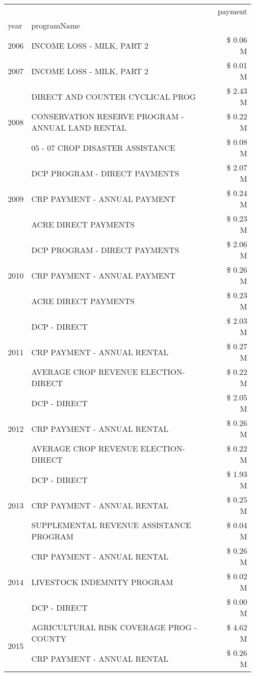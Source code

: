 \begin{tabular}{llr}
\toprule
 &  & payment \\
year & programName &  \\
\midrule
2006 & INCOME LOSS - MILK, PART 2 & \$ 0.06 M \\
\cline{1-3}
2007 & INCOME LOSS - MILK, PART 2 & \$ 0.01 M \\
\cline{1-3}
\multirow[t]{3}{*}{2008} & DIRECT AND COUNTER CYCLICAL PROG & \$ 2.43 M \\
 & CONSERVATION RESERVE PROGRAM - ANNUAL LAND RENTAL & \$ 0.22 M \\
 & 05 - 07 CROP DISASTER ASSISTANCE & \$ 0.08 M \\
\cline{1-3}
\multirow[t]{3}{*}{2009} & DCP PROGRAM - DIRECT PAYMENTS & \$ 2.07 M \\
 & CRP PAYMENT - ANNUAL PAYMENT & \$ 0.24 M \\
 & ACRE DIRECT PAYMENTS & \$ 0.23 M \\
\cline{1-3}
\multirow[t]{3}{*}{2010} & DCP PROGRAM - DIRECT PAYMENTS & \$ 2.06 M \\
 & CRP PAYMENT - ANNUAL PAYMENT & \$ 0.26 M \\
 & ACRE DIRECT PAYMENTS & \$ 0.23 M \\
\cline{1-3}
\multirow[t]{3}{*}{2011} & DCP - DIRECT & \$ 2.03 M \\
 & CRP PAYMENT - ANNUAL RENTAL & \$ 0.27 M \\
 & AVERAGE CROP REVENUE ELECTION-DIRECT & \$ 0.22 M \\
\cline{1-3}
\multirow[t]{3}{*}{2012} & DCP - DIRECT & \$ 2.05 M \\
 & CRP PAYMENT - ANNUAL RENTAL & \$ 0.26 M \\
 & AVERAGE CROP REVENUE ELECTION-DIRECT & \$ 0.22 M \\
\cline{1-3}
\multirow[t]{3}{*}{2013} & DCP - DIRECT & \$ 1.93 M \\
 & CRP PAYMENT - ANNUAL RENTAL & \$ 0.25 M \\
 & SUPPLEMENTAL REVENUE ASSISTANCE PROGRAM & \$ 0.04 M \\
\cline{1-3}
\multirow[t]{3}{*}{2014} & CRP PAYMENT - ANNUAL RENTAL & \$ 0.26 M \\
 & LIVESTOCK INDEMNITY PROGRAM & \$ 0.02 M \\
 & DCP - DIRECT & \$ 0.00 M \\
\cline{1-3}
\multirow[t]{2}{*}{2015} & AGRICULTURAL RISK COVERAGE PROG - COUNTY & \$ 4.62 M \\
 & CRP PAYMENT - ANNUAL RENTAL & \$ 0.26 M \\

\end{tabular}
